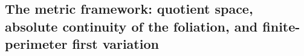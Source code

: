 %
%
%

\subsection{The metric framework: quotient space, absolute continuity of the
foliation, and finite-perimeter first variation}
\label{sec:metric-framework}

